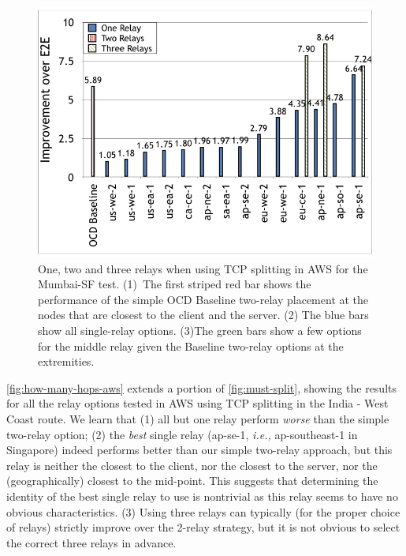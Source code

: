 \documentclass[newfonts=false,format=sigconf,anonymous,10pt,letterpaper]{acmart}
\providecommand{\ie}{\emph{i.e.,} }
\providecommand{\eg}{\emph{e.g.,} }
\begin{document}
\begin{figure}
  \centering
    \includegraphics[width=\columnwidth,trim=2mm 5mm 1mm 5mm,clip]{figures/hops.png}
    \caption{One, two and three relays when using TCP splitting in AWS for the Mumbai-SF test. (1)~The first striped red bar shows the performance of the simple OCD Baseline two-relay placement at the nodes that are closest to the client and the server. (2) The blue bars show all single-relay options. %
    (3)The green bars show a few options for the middle relay 
    given the Baseline two-relay options at the extremities.
    } 
    \label{fig:how-many-hops-aws}
\end{figure}

\autoref{fig:how-many-hops-aws} extends a portion of \autoref{fig:must-split}, showing the results for all the relay options tested in AWS using TCP splitting in the India - West Coast route. 
We learn that (1) all but one relay perform \emph{worse} than the simple two-relay option; (2) the \emph{best} single relay (ap-se-1, \ie ap-southeast-1 in Singapore) indeed performs better than our simple two-relay approach, but this relay is neither the closest to the client, nor the closest to the server, nor the (geographically) closest to the mid-point. 
This suggests that determining the identity of the best single relay to use is nontrivial as this relay seems to have no obvious characteristics. 
(3) Using three  relays can typically (for the proper choice of relays) strictly improve over the 2-relay strategy, but it is not obvious to select the correct three relays in advance.
\end{document}
